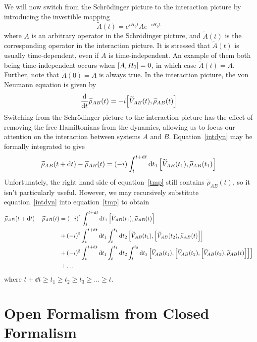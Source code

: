 \documentclass[aps, prl, preprint]{revtex4-1}
\newcommand{\til}[1]{\widetilde{#1}}
\begin{document}
We will now switch from the Schr{\"o}dinger picture to the interaction picture by introducing the invertible mapping
\begin{equation}\label{intpic}
\til{A}(t) = e^{iH_0t}Ae^{-iH_0t}
\end{equation}
where $A$ is an arbitrary operator in the Schr{\"o}dinger picture, and $\til{A}(t)$ is the corresponding operator in the interaction picture. It is stressed that $\til{A}(t)$ is usually time-dependent, even if $A$ is time-independent. An example of them both being time-independent occurs when $\comm{A}{H_0} = 0$, in which case $\til{A}(t) = A$. Further, note that $\til{A}(0) = A$ is always true. In the interaction picture, the von Neumann equation is given by
\begin{equation}\label{intdyn}
\dv{t}\til{\rho}_{AB}(t) = -i\comm{\til{V}_{AB}(t)}{\til{\rho}_{AB}(t)}
\end{equation}
Switching from the Schr{\"o}dinger picture to the interaction picture has the effect of removing the free Hamiltonians from the dynamics, allowing us to focus our attention on the interaction between systems $A$ and $B$. Equation~\ref{intdyn} may be formally integrated to give
\begin{equation}\label{tmp}
\til{\rho}_{AB}(t+\dd{t}) - \til{\rho}_{AB}(t) = (-i)\int_t^{t+\dd{t}}\dd{t_1}\comm{\til{V}_{AB}(t_1)}{\til{\rho}_{AB}(t_1)}
\end{equation}
Unfortunately, the right hand side of equation~\ref{tmp} still contains $\til{\rho}_{AB}(t)$, so it isn't particularly useful. However, we may recursively substitute equation~\ref{intdyn} into equation~\ref{tmp} to obtain
\begin{align}\label{totintpert}
\begin{split}
\til{\rho}_{AB}(t+\dd{t}) - \til{\rho}_{AB}(t) &= (-i)^1\int_t^{t+\dd{t}}\dd{t_1}\comm{\til{V}_{AB}(t_1)}{\til{\rho}_{AB}(t)}\\
&+(-i)^2\int_t^{t+\dd{t}}\dd{t_1}\int_t^{t_1}\dd{t_2}\comm{\til{V}_{AB}(t_1)}{\comm{\til{V}_{AB}(t_2)}{\til{\rho}_{AB}(t)}}\\
&+(-i)^3\int_t^{t+\dd{t}}\dd{t_1}\int_t^{t_1}\dd{t_2}\int_t^{t_2}\dd{t_3}\comm{\til{V}_{AB}(t_1)}{\comm{\til{V}_{AB}(t_2)}{\comm{\til{V}_{AB}(t_3)}{\til{\rho}_{AB}(t)}}}\\
&+\ldots
\end{split}
\end{align}
where $t+\dd{t}\geq t_1\geq t_2\geq t_3\geq \ldots\geq t$.

\section{Open Formalism from Closed Formalism}
\end{document}
